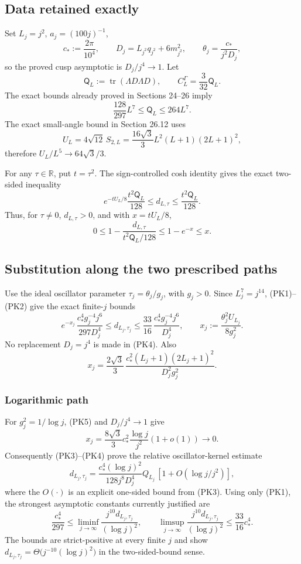 \documentclass[
  11pt,
]{article}
\begin{document}
\subsection{Data retained exactly}\label{data-retained-exactly}

Set \(L_j=j^2\), \(a_j=(100j)^{-1}\), \[
 c_*:=\frac{2\pi}{10^4},\qquad
 D_j=L_{j^2}q_{j^2}+6m_{j^2}^2,\qquad
 \theta_j=\frac{c_*}{j^2D_j},
\] so the proved cusp asymptotic is \(D_j/j^4\to1\). Let \[
 \mathsf Q_L:=\operatorname{tr}(\Lambda D\Lambda D),
 \qquad
 C_L^\Gamma=\frac3{32}\mathsf Q_L.
\] The exact bounds already proved in Sections 24--26 imply \[
 \frac{128}{297}L^7\le \mathsf Q_L\le264L^7. \tag{PK1}
\] The exact small-angle bound in Section 26.12 uses \[
 U_L=4\sqrt{12}\,S_{2,L}
 =\frac{16\sqrt3}{3}L^2(L+1)(2L+1)^2,
\] therefore \(U_L/L^5\to64\sqrt3/3\).

For any \(\tau\in\mathbb R\), put \(t=\tau^2\). The sign-controlled cosh
identity gives the exact two-sided inequality \[
 e^{-tU_L/8}\frac{t^2\mathsf Q_L}{128}
 \le d_{L,\tau}
 \le\frac{t^2\mathsf Q_L}{128}. \tag{PK2}
\] Thus, for \(\tau\ne0\), \(d_{L,\tau}>0\), and with \(x=tU_L/8\), \[
0\le1-\frac{d_{L,\tau}}{t^2\mathsf Q_L/128}
 \le1-e^{-x}\le x. \tag{PK3}
\]

\subsection{Substitution along the two prescribed
paths}\label{substitution-along-the-two-prescribed-paths}

Use the ideal oscillator parameter \(\tau_j=\theta_j/g_j\), with
\(g_j>0\). Since \(L_j^7=j^{14}\), (PK1)--(PK2) give the exact
finite-\(j\) bounds \[
 e^{-x_j}\,\frac{c_*^4g_j^{-4}j^6}{297D_j^4}
 \le d_{L_j,\tau_j}
 \le \frac{33}{16}\,\frac{c_*^4g_j^{-4}j^6}{D_j^4},
 \qquad
 x_j:=\frac{\theta_j^2U_{L_j}}{8g_j^2}. \tag{PK4}
\] No replacement \(D_j=j^4\) is made in (PK4). Also \[
 x_j=\frac{2\sqrt3}{3}\,
 \frac{c_*^2(L_j+1)(2L_j+1)^2}{D_j^2g_j^2}. \tag{PK5}
\]

\subsubsection{Logarithmic path}\label{logarithmic-path}

For \(g_j^2=1/\log j\), (PK5) and \(D_j/j^4\to1\) give \[
 x_j=\frac{8\sqrt3}{3}c_*^2\frac{\log j}{j^2}(1+o(1))
 \longrightarrow0. \tag{PK6}
\] Consequently (PK3)--(PK4) prove the relative oscillator-kernel
estimate \[
 d_{L_j,\tau_j}
 =\frac{c_*^4(\log j)^2}{128j^8D_j^4}Q_{L_j}
 \,[1+O(\log j/j^2)], \tag{PK7}
\] where the \(O(\cdot)\) is an explicit one-sided bound from (PK3).
Using only (PK1), the strongest asymptotic constants currently justified
are \[
 \frac{c_*^4}{297}
 \le\liminf_{j\to\infty}\frac{j^{10}d_{L_j,\tau_j}}{(\log j)^2},
 \qquad
 \limsup_{j\to\infty}\frac{j^{10}d_{L_j,\tau_j}}{(\log j)^2}
 \le\frac{33}{16}c_*^4. \tag{PK8}
\] The bounds are strict-positive at every finite \(j\) and show
\(d_{L_j,\tau_j}=\Theta\big(j^{-10}(\log j)^2\big)\) in the
two-sided-bound sense.
\end{document}
